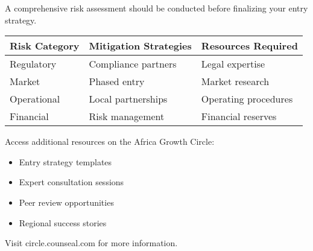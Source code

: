 \begin{importantbox}
A comprehensive risk assessment should be conducted before finalizing your entry strategy.
\end{importantbox}

\begin{center}
\begin{tabular}{p{}|p{}|p{}}
    \textbf{Risk Category} & \textbf{Mitigation Strategies} & \textbf{Resources Required} \\
    \hline
    Regulatory & Compliance partners & Legal expertise \\
    Market & Phased entry & Market research \\
    Operational & Local partnerships & Operating procedures \\
    Financial & Risk management & Financial reserves \\
\end{tabular}
\end{center}

\begin{communitybox}
Access additional resources on the Africa Growth Circle:
\begin{itemize}
    \item Entry strategy templates
    \item Expert consultation sessions
    \item Peer review opportunities
    \item Regional success stories
\end{itemize}
Visit circle.counseal.com for more information.
\end{communitybox}


